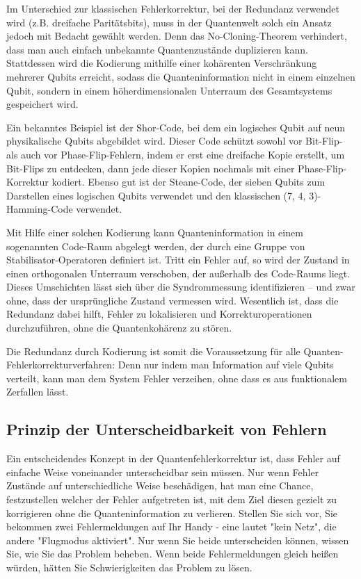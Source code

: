 Im Unterschied zur klassischen Fehlerkorrektur, bei der Redundanz verwendet wird (z.B. dreifache Paritätsbits), muss in der Quantenwelt solch ein Ansatz jedoch mit Bedacht gewählt werden. Denn das No-Cloning-Theorem verhindert, dass man auch einfach unbekannte Quantenzustände duplizieren kann. \cite{nielsen_quantum_2010} Stattdessen wird die Kodierung mithilfe einer kohärenten Verschränkung mehrerer Qubits erreicht, sodass die Quanteninformation nicht in einem einzelnen Qubit, sondern in einem höherdimensionalen Unterraum des Gesamtsystems gespeichert wird.

Ein bekanntes Beispiel ist der Shor-Code, bei dem ein logisches Qubit auf neun physikalische Qubits abgebildet wird. Dieser Code schützt sowohl vor Bit-Flip- als auch vor Phase-Flip-Fehlern, indem er erst eine dreifache Kopie erstellt, um Bit-Flips zu entdecken, dann jede dieser Kopien nochmals mit einer Phase-Flip-Korrektur kodiert. \cite{shor_scheme_1995}
Ebenso gut ist der Steane-Code, der sieben Qubits zum Darstellen eines logischen Qubits verwendet und den klassischen (7, 4, 3)-Hamming-Code verwendet. \cite{steane_error_1996}

Mit Hilfe einer solchen Kodierung kann Quanteninformation in einem sogenannten Code-Raum abgelegt werden, der durch eine Gruppe von Stabilisator-Operatoren definiert ist. Tritt ein Fehler auf, so wird der Zustand in einen orthogonalen Unterraum verschoben, der außerhalb des Code-Raums liegt. Dieses Umschichten lässt sich über die Syndrommessung identifizieren – und zwar ohne, dass der ursprüngliche Zustand vermessen wird. Wesentlich ist, dass die Redundanz dabei hilft, Fehler zu lokalisieren und Korrekturoperationen durchzuführen, ohne die Quantenkohärenz zu stören.

Die Redundanz durch Kodierung ist somit die Voraussetzung für alle Quanten-Fehlerkorrekturverfahren: Denn nur indem man Information auf viele Qubits verteilt, kann man dem System Fehler verzeihen, ohne dass es aus funktionalem Zerfallen lässt.

\subsection{Prinzip der Unterscheidbarkeit von Fehlern}
Ein entscheidendes Konzept in der Quantenfehlerkorrektur ist, dass Fehler auf einfache Weise voneinander unterscheidbar sein müssen. Nur wenn Fehler Zustände auf unterschiedliche Weise beschädigen, hat man eine Chance, festzustellen welcher der Fehler aufgetreten ist, mit dem Ziel diesen gezielt zu korrigieren ohne die Quanteninformation zu verlieren. Stellen Sie sich vor, Sie bekommen zwei Fehlermeldungen auf Ihr Handy - eine lautet "kein Netz", die andere "Flugmodus aktiviert". Nur wenn Sie beide unterscheiden können, wissen Sie, wie Sie das Problem beheben. Wenn beide Fehlermeldungen gleich heißen würden, hätten Sie Schwierigkeiten das Problem zu lösen. 

